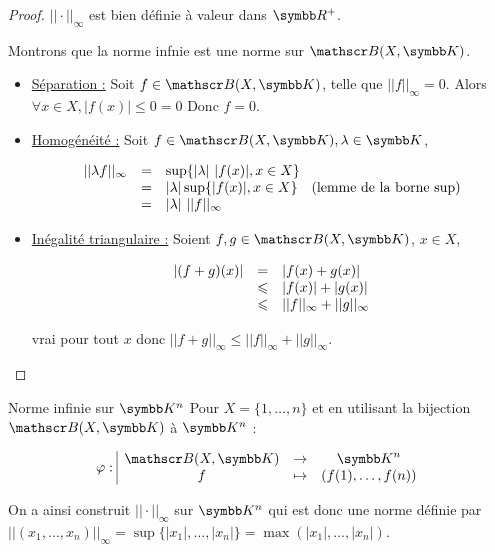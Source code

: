\begin{proof}
    $|| \cdot ||_\infty$ est bien définie à valeur dans $\R^+$.

    Montrons que la norme infnie est une norme sur $\mathscr B (X, \K)$. 

    \begin{itemize}
        \item \uline{Séparation :}
        Soit $f \in \mathscr B(X, \K)$, telle que $||f ||_\infty = 0$. 
        Alors $\forall x \in X, |f(x)| \leqslant 0 = 0$
        Donc $f = 0$.

        \item \uline{Homogénéité :} Soit $f \in \mathscr B(X, \K), \lambda \in \K$,

        \[
        \begin{array}{rcl}
            || \lambda f ||_\infty & = & \sup\{|\lambda|~|f(x)|, x \in X\} \\
            \space & = & |\lambda| \sup \{ |f(x)| , x \in X\} \quad \text{(lemme de la borne sup)}\\
            \space & = & |\lambda| ~ ||f ||_\infty \\
        \end{array}
        \]

        \item \uline{Inégalité triangulaire :} Soient $f, g \in \mathscr B(X, \K)$, $x \in X$, 

        \[
        \begin{array}{rcl}
            |(f + g)(x)| & = & |f(x) + g(x)| \\
            \space & \leqslant & |f(x)| + |g(x)| \\
            \space & \leqslant & ||f||_\infty + ||g ||_\infty \\
        \end{array}
        \]

        vrai pour tout $x$ donc $|| f + g||_\infty \leqslant ||f||_\infty + ||g||_\infty$.
    \end{itemize}
\end{proof}

\begin{definition}{Norme infinie sur $\K^n$}{}
    Pour $X = \{1, \dots, n\}$ et en utilisant la bijection $\mathscr B(X, \K)$
    à $\K^n$ :

    \[\fonction{\varphi}{\mathscr B(X, \K)}{\K^n}{f}{(f(1), \dots, f(n))}\]

    On a ainsi construit $|| \cdot ||_\infty$ sur $\K^n$ qui est donc une norme définie
    par $||(x_1, \dots, x_n)||_\infty = \sup\{|x_1|, \dots, |x_n| \} = \max (|x_1|, \dots, |x_n|)$.
\end{definition}

